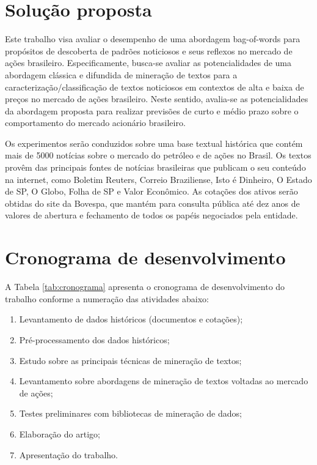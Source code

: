 \documentclass[11pt,a4paper]{article}
\begin{document}
\section{Solução proposta}
Este trabalho visa avaliar o desempenho de uma abordagem bag-of-words \cite{Manning:IR} para propósitos de descoberta de padrões noticiosos
e seus reflexos no mercado de ações brasileiro. Especificamente, busca-se avaliar as potencialidades de uma abordagem
clássica e difundida de mineração de textos para a caracterização/classificação de textos noticiosos em contextos de alta e baixa de
preços no mercado de ações brasileiro. Neste sentido, avalia-se as potencialidades da abordagem proposta para realizar previsões
de curto e médio prazo sobre o comportamento do mercado acionário brasileiro.

Os experimentos serão conduzidos sobre uma base textual histórica que contém mais de 5000 notícias sobre o mercado do
petróleo e de ações no Brasil. Os textos provêm das principais fontes de notícias brasileiras que publicam o seu conteúdo na
internet, como Boletim Reuters, Correio Braziliense, Isto é Dinheiro, O Estado de SP, O Globo, Folha de SP e Valor Econômico.
As cotações dos ativos serão obtidas do site da Bovespa, que mantém para consulta pública até dez anos de valores de abertura e
fechamento de todos os papéis negociados pela entidade.

\section{Cronograma de desenvolvimento}\label{sec:cronograma}

A Tabela \ref{tab:cronograma} apresenta o cronograma de desenvolvimento do trabalho conforme a numeração das atividades abaixo:
\begin{enumerate}
	\item Levantamento de dados históricos (documentos e cotações);
	\item Pré-processamento dos dados históricos;
	\item Estudo sobre as principais técnicas de mineração de textos;  
	\item Levantamento sobre abordagens de mineração de textos voltadas ao mercado de ações;
	\item Testes preliminares com bibliotecas de mineração de dados;
	\item Elaboração do artigo;
	\item Apresentação do trabalho.
\end{enumerate}
\end{document}
